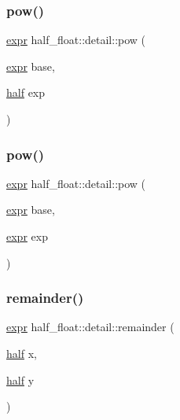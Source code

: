 \subsubsection{\texorpdfstring{pow()}{pow()}\hspace{0.1cm}{\footnotesize\ttfamily [3/4]}}
{\footnotesize\ttfamily \hyperlink{structhalf__float_1_1detail_1_1expr}{expr} half\+\_\+float\+::detail\+::pow (\begin{DoxyParamCaption}\item[{\hyperlink{structhalf__float_1_1detail_1_1expr}{expr}}]{base,  }\item[{\hyperlink{classhalf__float_1_1half}{half}}]{exp }\end{DoxyParamCaption})\hspace{0.3cm}{\ttfamily [inline]}}

\mbox{\label{namespacehalf__float_1_1detail_a3904b20401171c0a102e4a8498d6acbc}} 
\subsubsection{\texorpdfstring{pow()}{pow()}\hspace{0.1cm}{\footnotesize\ttfamily [4/4]}}
{\footnotesize\ttfamily \hyperlink{structhalf__float_1_1detail_1_1expr}{expr} half\+\_\+float\+::detail\+::pow (\begin{DoxyParamCaption}\item[{\hyperlink{structhalf__float_1_1detail_1_1expr}{expr}}]{base,  }\item[{\hyperlink{structhalf__float_1_1detail_1_1expr}{expr}}]{exp }\end{DoxyParamCaption})\hspace{0.3cm}{\ttfamily [inline]}}

\mbox{\label{namespacehalf__float_1_1detail_ab5ec4bbe576c7a623212d2a8e5fe4a30}} 
\subsubsection{\texorpdfstring{remainder()}{remainder()}\hspace{0.1cm}{\footnotesize\ttfamily [1/4]}}
{\footnotesize\ttfamily \hyperlink{structhalf__float_1_1detail_1_1expr}{expr} half\+\_\+float\+::detail\+::remainder (\begin{DoxyParamCaption}\item[{\hyperlink{classhalf__float_1_1half}{half}}]{x,  }\item[{\hyperlink{classhalf__float_1_1half}{half}}]{y }\end{DoxyParamCaption})\hspace{0.3cm}{\ttfamily [inline]}}

